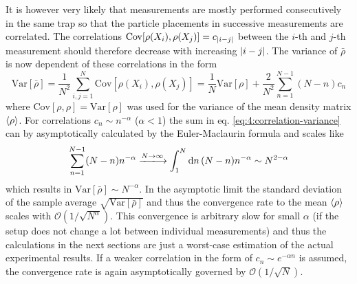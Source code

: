 It is however very likely that measurements are mostly performed consecutively in the same trap so that the particle placements in successive measurements are correlated.
The correlations $\mathrm{Cov}[\rho(X_i), \rho(X_j)] = c_{\left\lvert i-j\right\rvert}$ between the $i$-th and $j$-th measurement should therefore decrease with increasing $\left\lvert i-j\right\rvert$.
The variance of $\bar{\rho}$ is now dependent of these correlations in the form \cite[p. 1227]{Riley_2018}
\begin{equation}\label{eq:4:correlation-variance}
  \mathrm{Var}[\bar{\rho}] = \frac{1}{N^2} \sum_{i,j=1}^{N} \mathrm{Cov}[\rho(X_i), \rho(X_j)] = \frac{1}{N}\mathrm{Var}[\rho] + \frac{2}{N^2}\sum_{n=1}^{N - 1}(N - n) c_n
\end{equation}
where $\mathrm{Cov}[\rho, \rho] = \mathrm{Var}[\rho]$ was used for the variance of the mean density matrix $\left\langle\rho\right\rangle$.
For correlations $c_n \sim n^{-\alpha}$ ($\alpha < 1$) the sum in eq. \eqref{eq:4:correlation-variance} can by asymptotically calculated by the Euler-Maclaurin formula and scales like
\begin{equation}
  \sum_{n=1}^{N - 1}(N - n)n^{-\alpha} \xlongrightarrow{N\rightarrow\infty} \int_1^{N}\dd n \, (N-n)n^{-\alpha} \sim N^{2-\alpha}
\end{equation}
which results in $\mathrm{Var}[\bar{\rho}] \sim N^{-\alpha}$. In the asymptotic limit the standard deviation of the sample average $\sqrt{\mathrm{Var}[\bar{\rho}]}$ and thus the convergence rate to the mean $\left\langle\rho\right\rangle$ scales with $\mathcal{O}(1/\sqrt{N^\alpha})$.
This convergence is arbitrary slow for small $\alpha$ (if the setup does not change a lot between individual measurements) and thus the calculations in the next sections are just a worst-case estimation of the actual experimental results.
If a weaker correlation in the form of $c_n \sim e^{-\alpha n}$ is assumed, the convergence rate is again asymptotically governed by $\mathcal{O}(1/\sqrt{N})$.









